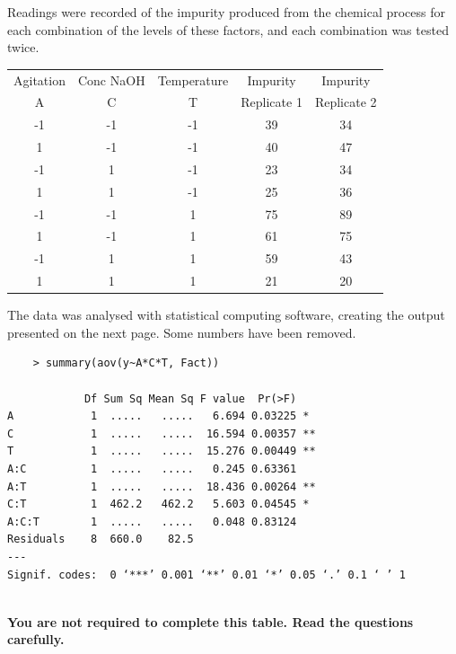 \documentclass[a4paper,12pt]{article}
\begin{document}
{\begin{itemize}
Readings were recorded of the impurity produced from the chemical process for each combination of the levels of these factors, and each combination was tested twice.
\begin{center}
	\begin{tabular}{|c|c|c|c|c|}
		\hline
		Agitation & Conc NaOH &  Temperature & Impurity & Impurity  \\
		A & C & T & Replicate 1 & Replicate 2  \\ \hline

					-1	&	-1	&	-1	&	 39 & 34	\\ \hline
					
					1	&	-1	&	-1	&	  40& 47	\\	 \hline
					
					-1	&	1	&	-1	&	 23& 34	\\ \hline
					
					1	&	1	&	-1	&25& 36	\\	 \hline
					
					-1	&	-1	&	1	&	75& 89 	\\ \hline
					
					1	&	-1	&	1	&	 61& 75	\\ \hline
					
					-1	&	1	&	1	&	 59& 43	\\ \hline							
					1	&	1	&	1	&	 21& 20\\ \hline
				\end{tabular}
			\end{center}
		

The data was analysed with statistical computing software, creating the output presented on the next page. Some numbers have been removed.
\newpage
\begin{framed}
	\begin{verbatim}
	> summary(aov(y~A*C*T, Fact))

            Df Sum Sq Mean Sq F value  Pr(>F)   
A            1  .....   .....   6.694 0.03225 * 
C            1  .....   .....  16.594 0.00357 **
T            1  .....   .....  15.276 0.00449 **
A:C          1  .....   .....   0.245 0.63361   
A:T          1  .....   .....  18.436 0.00264 **
C:T          1  462.2   462.2   5.603 0.04545 * 
A:C:T        1  .....   .....   0.048 0.83124   
Residuals    8  660.0    82.5                   
---
Signif. codes:  0 ‘***’ 0.001 ‘**’ 0.01 ‘*’ 0.05 ‘.’ 0.1 ‘ ’ 1
	
	\end{verbatim}
\noindent \textbf{You are not required to complete this table. Read the questions carefully.}	
\end{framed}	


\end{itemize}}
\end{document}
